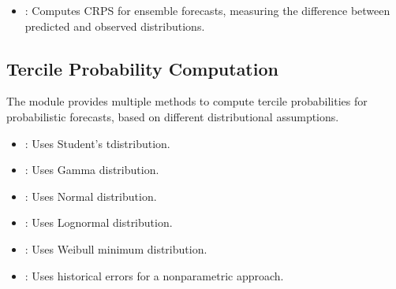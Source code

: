 \documentclass[letterpaper,10pt,english]{sphinxmanual}
\begin{document}
\sphinxAtStartPar
{}
\begin{itemize}
\item {} 
\sphinxAtStartPar
{}: Computes CRPS for ensemble forecasts, measuring the difference between predicted and observed distributions.

\end{itemize}


\subsection{Tercile Probability Computation}
\label{\detokenize{Verification:tercile-probability-computation}}
\sphinxAtStartPar
The module provides multiple methods to compute tercile probabilities for probabilistic forecasts, based on different distributional assumptions.

\sphinxAtStartPar
{}
\begin{itemize}
\item {} 
\sphinxAtStartPar
{}: Uses Student’s t\sphinxhyphen{}distribution.

\item {} 
\sphinxAtStartPar
{}: Uses Gamma distribution.

\item {} 
\sphinxAtStartPar
{}: Uses Normal distribution.

\item {} 
\sphinxAtStartPar
{}: Uses Lognormal distribution.

\item {} 
\sphinxAtStartPar
{}: Uses Weibull minimum distribution.

\item {} 
\sphinxAtStartPar
{}: Uses historical errors for a non\sphinxhyphen{}parametric approach.

\end{itemize}

\sphinxAtStartPar
{}

\begin{sphinxVerbatim}[commandchars=\\\{\}]
  
       
\end{sphinxVerbatim}
\end{document}
